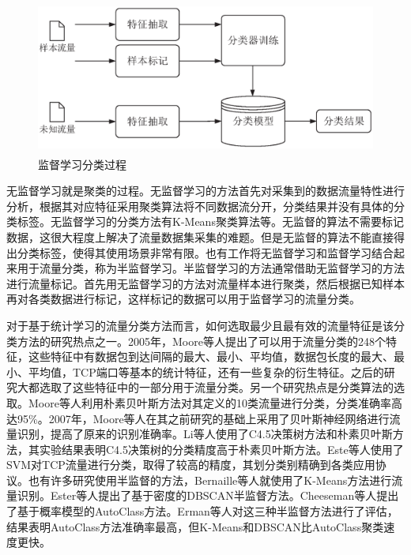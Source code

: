 \begin{figure}[thb]
\centering
\includegraphics[height=2in]{./figures/2/2-2}
\caption{监督学习分类过程}
\label{fig:22}
\end{figure}

无监督学习就是聚类的过程。无监督学习的方法首先对采集到的数据流量特性进行分析，根据其对应特征采用聚类算法将不同数据流分开，分类结果并没有具体的分类标签。无监督学习的分类方法有K-Means聚类算法等。无监督的算法不需要标记数据，这很大程度上解决了流量数据集采集的难题。但是无监督的算法不能直接得出分类标签，使得其使用场景非常有限。也有工作将无监督学习和监督学习结合起来用于流量分类，称为半监督学习。半监督学习的方法通常借助无监督学习的方法进行流量标记。首先用无监督学习的方法对流量样本进行聚类，然后根据已知样本再对各类数据进行标记，这样标记的数据可以用于监督学习的流量分类。

对于基于统计学习的流量分类方法而言，如何选取最少且最有效的流量特征是该分类方法的研究热点之一。2005年，Moore等人\supercite{moore2005internet}提出了可以用于流量分类的248个特征，这些特征中有数据包到达间隔的最大、最小、平均值，数据包长度的最大、最小、平均值，TCP端口等基本的统计特征，还有一些复杂的衍生特征。之后的研究大都选取了这些特征中的一部分用于流量分类。另一个研究热点是分类算法的选取。Moore等人利用朴素贝叶斯方法对其定义的10类流量进行分类，分类准确率高达95\%。2007年，Moore等人在其之前研究的基础上采用了贝叶斯神经网络进行流量识别\supercite{auld2007bayesian}，提高了原来的识别准确率。Li等人使用了C4.5决策树方法和朴素贝叶斯方法，其实验结果表明C4.5决策树的分类精度高于朴素贝叶斯方法\supercite{li2009efficient}。Este等人使用了SVM对TCP流量进行分类，取得了较高的精度，其划分类别精确到各类应用协议\supercite{este2009support}。也有许多研究使用半监督的方法，Bernaille等人就使用了K-Means方法进行流量识别\supercite{bernaille2006traffic}。Ester等人提出了基于密度的DBSCAN半监督方法\supercite{ester1996density}。Cheeseman等人提出了基于概率模型的AutoClass方法\supercite{cheeseman1993autoclass}。Erman等人对这三种半监督方法进行了评估，结果表明AutoClass方法准确率最高，但K-Means和DBSCAN比AutoClass聚类速度更快\supercite{erman2006traffic}。

